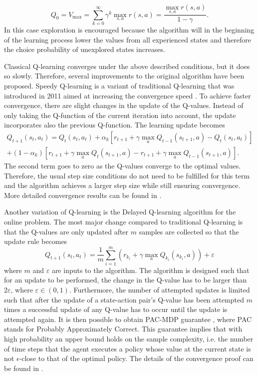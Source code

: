 \documentclass[../main.tex]{subfiles}
\begin{document}
\begin{equation}\label{eq:optimistic_init}
    Q_0 = V_{\max} = \sum_{k=0}^\infty \gamma^k\max_{s,a}r(s,a) = \dfrac{\max_{s,a}{r(s,a)}}{1-\gamma}.
\end{equation}
In this case exploration is encouraged because the algorithm will in the beginning of the learning process lower the values from all experienced states and therefore the choice probability of unexplored states increases. \par
Classical Q-learning converges under the above described conditions, but it does so slowly. Therefore, several improvements to the original algorithm have been proposed. Speedy Q-learning is a variant of traditional Q-learning that was introduced in 2011 aimed at increasing the convergence speed \cite{azar2011speedy}. To achieve faster convergence, there are slight changes in the update of the Q-values. Instead of only taking the Q-function of the current iteration into account, the update incorporates also the previous Q-function. The learning update becomes
\begin{multline}
Q_{t+1}(s_t,a_t) = Q_{t}(s_t,a_t) + \alpha_k \left[ r_{t+1}+\gamma \max_a Q_{t-1}(s_{t+1},a) - Q_{t}(s_t,a_t)\right] \\+ (1-\alpha_k) \left[ r_{t+1}+\gamma \max_a Q_{t}(s_{t+1},a) -  r_{t+1}+\gamma \max_a Q_{t-1}(s_{t+1},a)\right].
\end{multline}
The second term goes to zero as the Q-values converge to the optimal values. Therefore, the usual step size conditions do not need to be fulfilled for this term and the algorithm achieves a larger step size while still ensuring convergence. More detailed convergence results can be found in \cite{azar2011speedy}.\par
Another variation of Q-learning is the Delayed Q-learning algorithm for the online problem. The most major change compared to traditional Q-learning is that the Q-values are only updated after $m$ samples are collected so that the update rule becomes
\begin{equation}\label{DelayedQ}
Q_{t+1}(s_t,a_t) = \dfrac{1}{m} \sum_{i=1}^m \left( r_{k_i} + \gamma \max_{a} Q_{k_i}(s_{k_i},a) \right) + \varepsilon
\end{equation}
where $m$ and $\varepsilon$ are inputs to the algorithm. The algorithm is designed such that for an update to be performed, the change in the Q-value has to be larger than $2\varepsilon$, where $\varepsilon \in (0,1)$. Furthermore, the number of attempted updates is limited such that after the update of a state-action pair's Q-value has been attempted $m$ times a successful update of any Q-value has to occur until the update is attempted again. It is then possible to obtain PAC-MDP guarantee \cite{strehl2006pac}, where PAC stands for Probably Approximately Correct. This guarantee implies that with high probability an upper bound holds on the sample complexity, i.e. the number of time steps that the agent executes a policy whose value at the current state is not $\epsilon$-close to that of the optimal policy. The details of the convergence proof can be found in \cite{strehl2006pac}.\par
\end{document}
